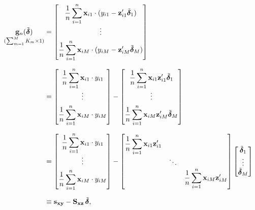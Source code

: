 \begin{align}
\underset{(\sum_{m=1}^{M} K_m \times 1)}{\mathbf{g}_n(\tilde{\boldsymbol{\delta}})}
&= \begin{bmatrix}
\dfrac{1}{n} \displaystyle\sum_{i=1}^{n} \mathbf{x}_{i1} \cdot
(y_{i1} - \mathbf{z}_{i1}' \tilde{\boldsymbol{\delta}}_1) \\[6pt]
\vdots \\[4pt]
\dfrac{1}{n} \displaystyle\sum_{i=1}^{n} \mathbf{x}_{iM} \cdot
(y_{iM} - \mathbf{z}_{iM}' \tilde{\boldsymbol{\delta}}_M)
\end{bmatrix} \notag \\[6pt]
&= \begin{bmatrix}
\dfrac{1}{n} \displaystyle\sum_{i=1}^{n} \mathbf{x}_{i1} \cdot y_{i1} \\[6pt]
\vdots \\[4pt]
\dfrac{1}{n} \displaystyle\sum_{i=1}^{n} \mathbf{x}_{iM} \cdot y_{iM}
\end{bmatrix}
- \begin{bmatrix}
\dfrac{1}{n} \displaystyle\sum_{i=1}^{n}
\mathbf{x}_{i1} \mathbf{z}_{i1}' \tilde{\boldsymbol{\delta}}_1 \\[6pt]
\vdots \\[4pt]
\dfrac{1}{n} \displaystyle\sum_{i=1}^{n}
\mathbf{x}_{iM} \mathbf{z}_{iM}' \tilde{\boldsymbol{\delta}}_M
\end{bmatrix} \notag \\[6pt]
&= \begin{bmatrix}
\dfrac{1}{n} \displaystyle\sum_{i=1}^{n} \mathbf{x}_{i1} \cdot y_{i1} \\[6pt]
\vdots \\[4pt]
\dfrac{1}{n} \displaystyle\sum_{i=1}^{n} \mathbf{x}_{iM} \cdot y_{iM}
\end{bmatrix}
- \begin{bmatrix}
\dfrac{1}{n} \displaystyle\sum_{i=1}^{n} \mathbf{x}_{i1} \mathbf{z}_{i1}' & & \\
& \ddots & \\
& & \dfrac{1}{n} \displaystyle\sum_{i=1}^{n} \mathbf{x}_{iM} \mathbf{z}_{iM}'
\end{bmatrix}
\begin{bmatrix}
\tilde{\boldsymbol{\delta}}_1 \\ \vdots \\ \tilde{\boldsymbol{\delta}}_M
\end{bmatrix} \notag \\[6pt]
&\equiv \mathbf{s}_{\mathbf{x}\mathbf{y}}
- \mathbf{S}_{\mathbf{x}\mathbf{z}}\, \tilde{\boldsymbol{\delta}},
\label{eq:4.2.1}
\end{align}
